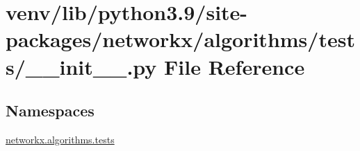 \hypertarget{venv_2lib_2python3_89_2site-packages_2networkx_2algorithms_2tests_2____init_____8py}{}\section{venv/lib/python3.9/site-\/packages/networkx/algorithms/tests/\+\_\+\+\_\+init\+\_\+\+\_\+.py File Reference}
\label{venv_2lib_2python3_89_2site-packages_2networkx_2algorithms_2tests_2____init_____8py}
\subsection*{Namespaces}
\begin{DoxyCompactItemize}
\item 
 \hyperlink{namespacenetworkx_1_1algorithms_1_1tests}{networkx.\+algorithms.\+tests}
\end{DoxyCompactItemize}
